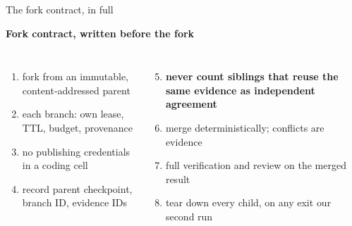\begin{frame}[t]{\ev{\tagM\,\tagP}The fork contract, in full}
\vspace{0pt}
{\small\textbf{Fork contract, written before the fork}\par\vspace{2pt}
\begin{columns}[T,onlytextwidth]
\begin{enumerate}\setlength{\itemsep}{0pt}
\item fork from an immutable, content-addressed parent
\item each branch: own lease, TTL, budget, provenance
\item no publishing credentials in a coding cell
\item record parent checkpoint, branch ID, evidence IDs
\end{enumerate}
\begin{enumerate}\setcounter{enumi}{4}\setlength{\itemsep}{0pt}
\item {\color{Rust}\bfseries never count siblings that reuse the same evidence as independent agreement}
\item merge deterministically; conflicts are evidence
\item full verification and review on the merged result
\item tear down every child, on any exit \hfill{\color{Muted}our second run}
\end{enumerate}
\end{columns}\par}
\end{frame}
